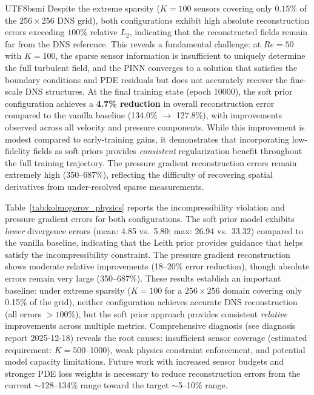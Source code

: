 \documentclass[master]{NTHUthesis}
\begin{document}
\begin{CJK*}{UTF8}{bsmi}
Despite the extreme sparsity ($K=100$ sensors covering only $0.15\%$ of the $256\times256$ DNS grid), both configurations exhibit high absolute reconstruction errors exceeding $100\%$ relative $L_2$, indicating that the reconstructed fields remain far from the DNS reference. This reveals a fundamental challenge: at $Re=50$ with $K=100$, the sparse sensor information is insufficient to uniquely determine the full turbulent field, and the PINN converges to a solution that satisfies the boundary conditions and PDE residuals but does not accurately recover the fine-scale DNS structures. At the final training state (epoch 10000), the soft prior configuration achieves a \textbf{4.7\% reduction} in overall reconstruction error compared to the vanilla baseline (134.0\% $\to$ 127.8\%), with improvements observed across all velocity and pressure components. While this improvement is modest compared to early-training gains, it demonstrates that incorporating low-fidelity fields as soft priors provides \emph{consistent} regularization benefit throughout the full training trajectory. The pressure gradient reconstruction errors remain extremely high (350--687\%), reflecting the difficulty of recovering spatial derivatives from under-resolved sparse measurements.

Table~\ref{tab:kolmogorov_physics} reports the incompressibility violation and pressure gradient errors for both configurations. The soft prior model exhibits \emph{lower} divergence errors (mean: 4.85 vs.\ 5.80; max: 26.94 vs.\ 33.32) compared to the vanilla baseline, indicating that the Leith prior provides guidance that helps satisfy the incompressibility constraint. The pressure gradient reconstruction shows moderate relative improvements (18--20\% error reduction), though absolute errors remain very large (350--687\%). These results establish an important baseline: under extreme sparsity ($K=100$ for a $256\times256$ domain covering only 0.15\% of the grid), neither configuration achieves accurate DNS reconstruction (all errors $>100\%$), but the soft prior approach provides consistent \emph{relative} improvements across multiple metrics. Comprehensive diagnosis (see diagnosis report 2025-12-18) reveals the root causes: insufficient sensor coverage (estimated requirement: $K=500$--1000), weak physics constraint enforcement, and potential model capacity limitations. Future work with increased sensor budgets and stronger PDE loss weights is necessary to reduce reconstruction errors from the current $\sim$128--134\% range toward the target $\sim$5--10\% range.


\end{CJK*}
\end{document}
